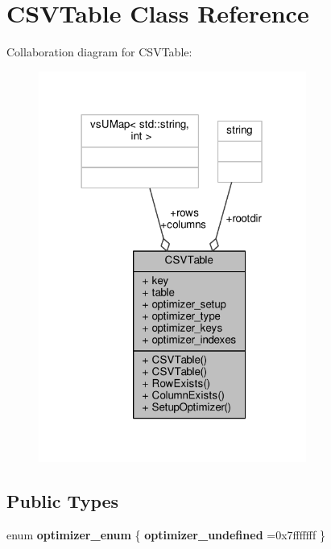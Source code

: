 \hypertarget{classCSVTable}{}\section{C\+S\+V\+Table Class Reference}
\label{classCSVTable}


Collaboration diagram for C\+S\+V\+Table\+:
\nopagebreak
\begin{figure}[H]
\begin{center}
\leavevmode
\includegraphics[width=249pt]{db/d01/classCSVTable__coll__graph}
\end{center}
\end{figure}
\subsection*{Public Types}
\begin{DoxyCompactItemize}
\item 
enum {\bfseries optimizer\+\_\+enum} \{ {\bfseries optimizer\+\_\+undefined} =0x7fffffff
 \}\hypertarget{classCSVTable_a489feda9ec30a72f913047a9fc61dac0}{}\label{classCSVTable_a489feda9ec30a72f913047a9fc61dac0}

\end{DoxyCompactItemize}
